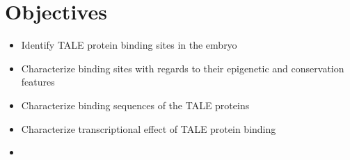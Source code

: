 \chapter{Objectives}
\label{chp:discussion}

\begin{itemize}

  \item Identify TALE protein binding sites in the embryo 
  
  \item Characterize binding sites with regards to their epigenetic and conservation features
  
  \item Characterize binding sequences of the TALE proteins
  
  \item Characterize transcriptional effect of TALE protein binding
  
  \item 
  
\end{itemize}